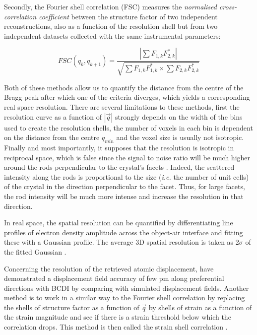 Secondly, the Fourier shell correlation (FSC) \parencite{VanHeel2005} measures the \textit{normalised cross-correlation coefficient} between the structure factor of two independent reconstructions, also as a function of the resolution shell but from two independent datasets collected with the same instrumental parameters:

\begin{equation}
    FSC(q_k, q_{k+1}) = \frac{ |\sum F_{1,k} F_{2,k}^*| }{\sqrt{ \sum F_{1,k} F_{1,k}^* \times \sum F_{2,k} F_{2,k}^*}}
\end{equation}

Both of these methods allow us to quantify the distance from the centre of the Bragg peak after which one of the criteria diverges, which yields a corresponding real space resolution.
There are several limitations to these methods, first the resolution curve as a function of $|\vec{q}|$ strongly depends on the width of the bins used to create the resolution shells, the number of voxels in each bin is dependent on the distance from the centre $q_{min}$ and the voxel size is usually not isotropic.
Finally and most importantly, it supposes that the resolution is isotropic in reciprocal space, which is false since the signal to noise ratio will be much higher around the rods perpendicular to the crystal's facets \parencite{Cherukara2018a}.
Indeed, the scattered intensity along the rods is proportional to the size (\textit{i.e.} the number of unit cells) of the crystal in the direction perpendicular to the facet.
Thus, for large facets, the rod intensity will be much more intense and increase the resolution in that direction.

In real space, the spatial resolution can be quantified by differentiating line profiles of electron density amplitude across the object-air interface and fitting these with a Gaussian profile.
The average 3D spatial resolution is taken as 2$\sigma$ of the fitted Gaussian \parencite{Hofmann2020}.

Concerning the resolution of the retrieved atomic displacement, \cite{Labat2015} have demonstrated a displacement field accuracy of few pm along preferential directions with BCDI by comparing with simulated displacement fields.
Another method is to work in a similar way to the Fourier shell correlation by replacing the shells of structure factor as a function of $\vec{q}$ by shells of strain as a function of the strain magnitude and see if there is a strain threshold below which the correlation drops.
This method is then called the strain shell correlation \parencite{Girard2020}.

